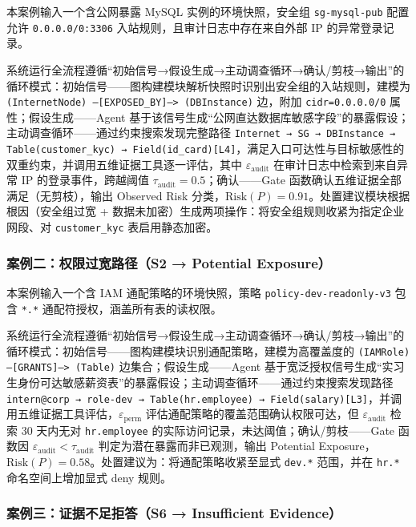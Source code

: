 \documentclass[a4paper,12pt]{ctexart}
\begin{document}
本案例输入一个含公网暴露 MySQL 实例的环境快照，安全组 \texttt{sg-mysql-pub} 配置允许 \texttt{0.0.0.0/0:3306} 入站规则，且审计日志中存在来自外部 IP 的异常登录记录。

系统运行全流程遵循“初始信号→假设生成→主动调查循环→确认/剪枝→输出”的循环模式：初始信号——图构建模块解析快照时识别出安全组的入站规则，建模为 \texttt{(InternetNode) --[EXPOSED\_BY]--> (DBInstance)} 边，附加 \texttt{cidr=0.0.0.0/0} 属性；假设生成——Agent 基于该信号生成“公网直达数据库敏感字段”的暴露假设；主动调查循环——通过约束搜索发现完整路径 \texttt{Internet → SG → DBInstance → Table(customer\_kyc) → Field(id\_card)[L4]}，满足入口可达性与目标敏感性的双重约束，并调用五维证据工具逐一评估，其中 $\varepsilon_\text{audit}$ 在审计日志中检索到来自异常 IP 的登录事件，跨越阈值 $\tau_\text{audit} = 0.5$；确认——Gate 函数确认五维证据全部满足（无剪枝），输出 Observed Risk 分类，$\mathrm{Risk}(P) = 0.91$。处置建议模块根据根因（安全组过宽 + 数据未加密）生成两项操作：将安全组规则收紧为指定企业网段、对 \texttt{customer\_kyc} 表启用静态加密。

\subsubsection{案例二：权限过宽路径（S2 → Potential Exposure）}

本案例输入一个含 IAM 通配策略的环境快照，策略 \texttt{policy-dev-readonly-v3} 包含 \texttt{*.*} 通配符授权，涵盖所有表的读权限。

系统运行全流程遵循“初始信号→假设生成→主动调查循环→确认/剪枝→输出”的循环模式：初始信号——图构建模块识别通配策略，建模为高覆盖度的 \texttt{(IAMRole) --[GRANTS]--> (Table)} 边集合；假设生成——Agent 基于宽泛授权信号生成“实习生身份可达敏感薪资表”的暴露假设；主动调查循环——通过约束搜索发现路径 \texttt{intern@corp → role-dev → Table(hr.employee) → Field(salary)[L3]}，并调用五维证据工具评估，$\varepsilon_\text{perm}$ 评估通配策略的覆盖范围确认权限可达，但 $\varepsilon_\text{audit}$ 检索 30 天内无对 \texttt{hr.employee} 的实际访问记录，未达阈值；确认/剪枝——Gate 函数因 $\varepsilon_\text{audit} < \tau_\text{audit}$ 判定为潜在暴露而非已观测，输出 Potential Exposure，$\mathrm{Risk}(P) = 0.58$。处置建议为：将通配策略收紧至显式 \texttt{dev.*} 范围，并在 \texttt{hr.*} 命名空间上增加显式 deny 规则。

\subsubsection{案例三：证据不足拒答（S6 → Insufficient Evidence）}
\end{document}
